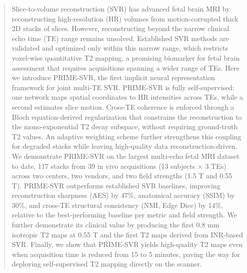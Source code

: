\documentclass[preprint,authoryear,12pt]{elsarticle}
\begin{document}
\begin{frontmatter}
\begin{abstract}
Slice-to-volume reconstruction (SVR) has advanced fetal brain MRI by reconstructing high-resolution (HR) volumes from motion-corrupted thick 2D stacks of slices. However, reconstructing beyond the narrow clinical echo time (TE) range remains unsolved. Established SVR methods are validated and optimized only within this narrow range, which restricts voxel-wise quantitative T2 mapping, a promising biomarker for fetal brain assessment that requires acquisitions spanning a wider range of TEs. Here we introduce PRIME-SVR, the first implicit neural representation framework for joint multi-TE SVR. PRIME-SVR is fully self-supervised: one network maps spatial coordinates to HR intensities across TEs, while a second estimates slice motion. Cross-TE coherence is enforced through a Bloch equation-derived regularization that constrains the reconstruction to the mono-exponential T2 decay subspace, without requiring ground-truth T2 values. An adaptive weighting scheme further strengthens this coupling for degraded stacks while leaving high-quality data reconstruction-driven. We demonstrate PRIME-SVR on the largest multi-echo fetal MRI dataset to date, 117 stacks from 39 in vivo acquisitions (13 subjects × 3 TEs) across two centers, two vendors, and two field strengths (1.5 T and 0.55 T). PRIME-SVR outperforms established SVR baselines, improving reconstruction sharpness (AES) by 47\%, anatomical accuracy (SSIM) by 30\%, and cross-TE structural consistency (NMI, Edge Dice) by 14\%, relative to the best-performing baseline per metric and field strength. We further demonstrate its clinical value by producing the first 0.8 mm isotropic T2 maps at 0.55 T and the first T2 maps derived from INR-based SVR. Finally, we show that PRIME-SVR yields high-quality T2 maps even when acquisition time is reduced from 15 to 5 minutes, paving the way for deploying self-supervised T2 mapping directly on the scanner.
\end{abstract}

\end{frontmatter}
\end{document}
